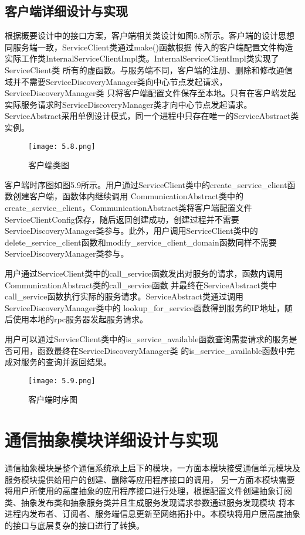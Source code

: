 \subsection{客户端详细设计与实现}
根据概要设计中的接口方案，客户端相关类设计如图5.8所示。客户端的设计思想同服务端一致，ServiceClient类通过make()函数根据
传入的客户端配置文件构造实际工作类InternalServiceClientImpl类。InternalServiceClientImpl类实现了ServiceClient类
所有的虚函数。与服务端不同，客户端的注册、删除和修改通信域并不需要ServiceDiscoveryManager类向中心节点发起请求，ServiceDiscoveryManager类
只将客户端配置文件保存至本地。只有在客户端发起实际服务请求时ServiceDiscoveryManager类才向中心节点发起请求。
ServiceAbstract采用单例设计模式，同一个进程中只存在唯一的ServiceAbstract类实例。

\begin{figure}[htb]
  \centering
  \texttt{[image: 5.8.png]}
  \caption{客户端类图}
  \label{fig:8}
\end{figure}
客户端时序图如图5.9所示。用户通过ServiceClient类中的create\_service\_client函数创建客户端，函数体内继续调用
CommunicationAbstract类中的create\_service\_client，CommunicationAbstract类将客户端配置文件
ServiceClientConfig保存，随后返回创建成功，创建过程并不需要ServiceDiscoveryManager类参与。此外，用户调用ServiceClient类中的
delete\_service\_client函数和modify\_service\_client\_domain函数同样不需要ServiceDiscoveryManager类参与。

用户通过ServiceClient类中的call\_service函数发出对服务的请求，函数内调用CommunicationAbstract类的call\_service函数
并最终在ServiceAbstract类中call\_service函数执行实际的服务请求。ServiceAbstract类通过调用ServiceDiscoveryManager类中的
lookup\_for\_service函数得到服务的IP地址，随后使用本地的rpc服务器发起服务请求。

用户可以通过ServiceClient类中的is\_service\_available函数查询需要请求的服务是否可用，函数最终在ServiceDiscoveryManager类
的is\_service\_available函数中完成对服务的查询并返回结果。

\begin{figure}[H]
  \centering
  \texttt{[image: 5.9.png]}
  \caption{客户端时序图}
  \label{fig:9}
\end{figure}

\section{通信抽象模块详细设计与实现}
通信抽象模块是整个通信系统承上启下的模块，一方面本模块接受通信单元模块及服务模块提供给用户的创建、删除等应用程序接口的调用，
另一方面本模块需要将用户所使用的高度抽象的应用程序接口进行处理，根据配置文件创建抽象订阅类、抽象发布类和抽象服务类并且生成服务发现请求参数通过服务发现模块
将本进程内发布者、订阅者、服务端信息更新至网络拓扑中。本模块将用户层高度抽象的接口与底层复杂的接口进行了转换。

